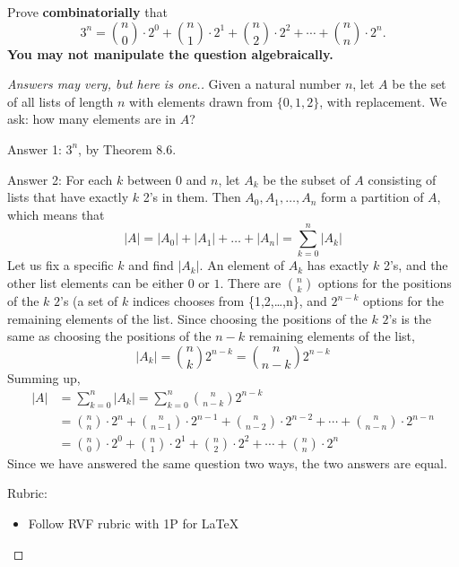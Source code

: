 \documentclass{article}
\theoremstyle{definition}
\begin{document}
\begin{question}
    Prove \textbf{combinatorially} that
    \[ 3^n = \binom{n}{0} \cdot 2^0 + \binom{n}{1}\cdot 2^1+ \binom{n}{2}\cdot 2^2+\cdots +\binom{n}{n}\cdot 2^n. \]
    \textbf{You may not manipulate the question algebraically.}
\end{question}
\begin{proof}
    [Answers may very, but here is one.]
    Given a natural number $n$, let $A$ be the set of all lists of length $n$ with elements drawn from $\{0,1,2\}$,
    with replacement.
    We ask: how many elements are in $A$?

    \noindent Answer 1: $3^n$, by Theorem 8.6.

    \noindent Answer 2: 
    For each $k$ between $0$ and $n$, let $A_k$ be the subset of $A$ consisting of lists that have exactly $k$ 2's in them. Then $A_0, A_1, \dots, A_n$ form a partition of $A$,
    which means that
    \[
        |A| = |A_0| + |A_1| + \dots + |A_n|
        = \sum_{k=0}^n |A_k|
    \]
    Let us fix a specific $k$ and find $|A_k|$.
    An element of $A_k$ has exactly $k$ 2's, and 
    the other list elements can be either $0$ or $1$. 
    There are $\binom{n}{k}$ options for the positions
    of the $k$ $2$'s (a set of $k$ indices chooses from \{1,2,\dots,n\}, 
    and $2^{n-k}$ options for the remaining elements of the list.
    Since choosing the positions of the $k$ $2$'s is the same as choosing the positions of the $n-k$ remaining elements of the list,
    \[
        |A_k| = \binom{n}{k} 2^{n-k} = \binom{n}{n-k} 2^{n-k}
    \]
    Summing up,
    \begin{align*}
        |A| &= \sum_{k=0}^n |A_k| = \sum_{k=0}^n \binom{n}{n-k} 2^{n-k}
        \\&= \binom{n}{n} \cdot 2^n + \binom{n}{n-1}\cdot 2^{n-1}+ \binom{n}{n-2}\cdot 2^{n-2}+\cdots +\binom{n}{n-n}\cdot 2^{n-n}
        \\&= \binom{n}{0} \cdot 2^0 + \binom{n}{1}\cdot 2^1+ \binom{n}{2}\cdot 2^2+\cdots +\binom{n}{n}\cdot 2^n
    \end{align*}
    Since we have answered the same question two ways, the two answers are equal.\qedhere
    
{\color{red} Rubric:
\begin{itemize}
\item Follow RVF rubric with 1P for \LaTeX
\end{itemize}}
\end{proof}
\end{document}

